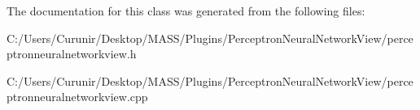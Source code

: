 The documentation for this class was generated from the following files\+:\begin{DoxyCompactItemize}
\item 
C\+:/\+Users/\+Curunir/\+Desktop/\+M\+A\+S\+S/\+Plugins/\+Perceptron\+Neural\+Network\+View/perceptronneuralnetworkview.\+h\item 
C\+:/\+Users/\+Curunir/\+Desktop/\+M\+A\+S\+S/\+Plugins/\+Perceptron\+Neural\+Network\+View/perceptronneuralnetworkview.\+cpp\end{DoxyCompactItemize}
